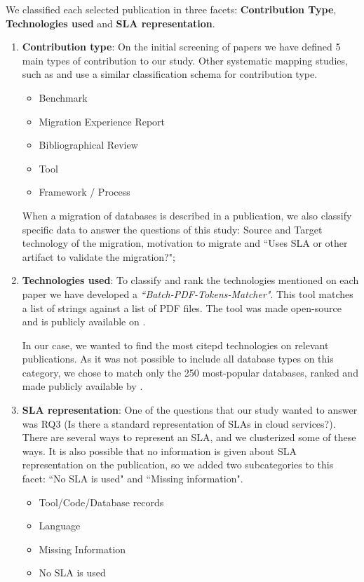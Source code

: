 \documentclass[]{tEIS2e}
\theoremstyle{plain}
\theoremstyle{remark}
\begin{document}
We classified each selected publication in three facets: \textbf{Contribution Type}, \textbf{Technologies used} and \textbf{SLA representation}. 


\begin{enumerate}
    \item \textbf{Contribution type}: On the initial screening of papers we have defined 5 main types of contribution to our study. Other systematic mapping studies, such as \citep{6405289} and \citep{Ameller201542} use a similar classification schema for contribution type.
    \begin{itemize}
      \item Benchmark
      \item Migration Experience Report
      \item Bibliographical Review
      \item Tool
      \item Framework / Process
    \end{itemize}

    When a migration of databases is described in a publication, we also classify specific data to answer the questions of this study:  Source and Target technology of the migration, motivation to migrate and ``Uses SLA or other artifact to validate the migration?"; 

    \item \textbf{Technologies used}: To classify and rank the technologies mentioned on each paper we have developed a \textit{``Batch-PDF-Tokens-Matcher"}. This tool matches a list of strings against a list of PDF files. The tool was made open-source and is publicly available on \citep{pythonBatchPDFTokenMatcher}.

    In our case, we wanted to find the most citepd technologies on relevant publications. As it was not possible to include all database types on this category, we chose to match only the 250 most-popular databases, ranked and made publicly available by \citep{dbranking}.

    \item \textbf{SLA representation}: One of the questions that our study wanted to answer was RQ3 (Is there a standard representation of SLAs in cloud services?). There are several ways to represent an SLA, and we clusterized some of these ways. It is also possible that no information is given about SLA representation on the publication, so we added two subcategories to this facet: ``No SLA is used" and ``Missing information".  
    \begin{itemize}
      \item Tool/Code/Database records
      \item Language
      \item Missing Information
      \item No SLA is used
    \end{itemize}  
\end{enumerate}
\end{document}
